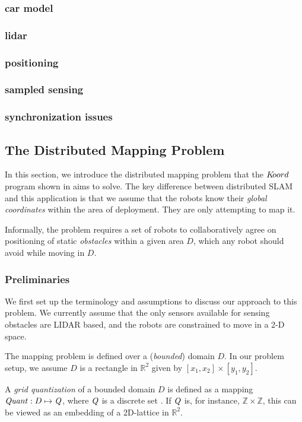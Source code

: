 \subsubsection{car model}
\subsubsection{lidar}
\subsubsection{positioning}
\subsubsection{sampled sensing}
\subsubsection{synchronization issues}
 
\subsection{The Distributed Mapping Problem}
In this section, we introduce the distributed mapping problem that the $K\kern-2pt oord$ program shown in  aims to solve. The key difference between distributed SLAM and this application is that we assume that the robots know their \emph{global coordinates} within the area of deployment. They are only attempting to map it.

Informally, the problem requires a set of robots to collaboratively agree on positioning of static \emph{obstacles} within a given area $D$, which any robot should avoid while moving in $D$. 


\subsubsection{Preliminaries}
\label{sec:prelims}
We first set up the terminology and assumptions to discuss our approach to this problem. We currently assume that the only sensors available for sensing obstacles are LIDAR based, and the robots are constrained to move in a 2-D space.

The mapping problem is defined over a (\emph{bounded}) domain $D$. In our problem setup, we assume $D$ is a rectangle in $\mathbb{R}^2$ given by $[x_1,x_2]\times [y_1,y_2]$.

\begin{definition}
A \emph{grid quantization} of a bounded domain $D$ is defined as a mapping $\mathit{Quant}:D \mapsto \mathit{Q}$, where $\mathit{Q}$ is a discrete set . If $\mathit{Q}$ is, for instance, $\mathbb{Z}\times \mathbb{Z}$, this can be viewed as an embedding of a 2D-lattice in $\mathbb{R}^2$. 
\end{definition}

